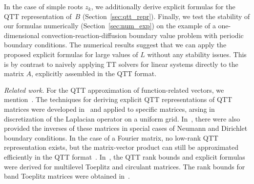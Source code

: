 \documentclass[a4paper]{article}
\newcommand{\LL}{L}
\begin{document}
In the case of simple roots $z_k$, we additionally derive explicit formulas for the QTT representation of~$B$ (Section~\ref{sec:qtt_repr}). 
Finally, we test the stability of our formulas numerically (Section~\ref{sec:num_exp}) on the example of a one-dimensional convection-reaction-diffusion boundary value problem with periodic boundary conditions.
The numerical results suggest that we can apply the proposed explicit formulas for large values of $L$ without any stability issues.
This is by contrast to naively applying TT solvers for linear systems directly to the matrix $A$, explicitly assembled in the QTT format.




\emph{Related work.} For the QTT approximation of function-related vectors, we mention~\cite{khor-qtt-2011,dk-qtt-tucker-2013,gras-tenz-2010,vysotsky2021tt}. 
The techniques for deriving explicit QTT representations of QTT matrices were developed in~\cite{khkaz-lap-2012} and applied to specific matrices, arsing in discretization of the Laplacian operator on a uniform grid.
In~\cite{khkaz-lap-2012}, there were also provided the inverses of these matrices in special cases of Neumann and Dirichlet boundary conditions.
In the case of a Fourier matrix, no low-rank QTT representation exists, but the matrix-vector product can still be approximated efficiently in the QTT format~\cite{dks-ttfft-2012}.
In~\cite{khkaz-conv-2013}, the QTT rank bounds and explicit formulas were derived for multilevel Toeplitz and circulant matrices.
The rank bounds for band Toeplitz matrices were obtained in~\cite{otz-teninv-2011}. 
\end{document}
